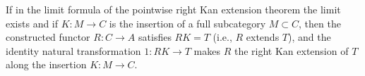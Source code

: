 If in the limit formula of the pointwise right Kan extension theorem the limit exists and if $K: M \to C$ is the insertion of a full subcategory $M \subset C$, then the constructed functor $R: C \to A$ satisfies $RK = T$ (i.e., $R$ extends $T$), and the identity natural transformation $1: RK \to T$ makes $R$ the right Kan extension of $T$ along the insertion $K: M \to C$.
